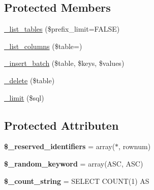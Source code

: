 \subsection*{Protected Members}
\begin{DoxyCompactItemize}
\item 
\mbox{\hyperlink{class_c_i___d_b__pdo__oci__driver_a435c0f3ce54fe7daa178baa8532ebd54}{\+\_\+list\+\_\+tables}} (\$prefix\+\_\+limit=F\+A\+L\+SE)
\item 
\mbox{\hyperlink{class_c_i___d_b__pdo__oci__driver_a7ccb7f9c301fe7f0a9db701254142b63}{\+\_\+list\+\_\+columns}} (\$table=\textquotesingle{}\textquotesingle{})
\item 
\mbox{\hyperlink{class_c_i___d_b__pdo__oci__driver_a1978e1358c812587a46e242630365099}{\+\_\+insert\+\_\+batch}} (\$table, \$keys, \$values)
\item 
\mbox{\hyperlink{class_c_i___d_b__pdo__oci__driver_a133ea8446ded52589bd22cc9163d0896}{\+\_\+delete}} (\$table)
\item 
\mbox{\hyperlink{class_c_i___d_b__pdo__oci__driver_a3a02ea06541b8ecc25a33a61651562c8}{\+\_\+limit}} (\$sql)
\end{DoxyCompactItemize}
\subsection*{Protected Attributen}
\begin{DoxyCompactItemize}
\item 
\mbox{\label{class_c_i___d_b__pdo__oci__driver_aa3298c4c62fbee8bb09f1b75b633fb0d}} 
{\bfseries \$\+\_\+reserved\+\_\+identifiers} = array(\textquotesingle{}$\ast$\textquotesingle{}, \textquotesingle{}rownum\textquotesingle{})
\item 
\mbox{\label{class_c_i___d_b__pdo__oci__driver_a10213aa6e05f6d924d3277bb1d2fea00}} 
{\bfseries \$\+\_\+random\+\_\+keyword} = array(\textquotesingle{}A\+SC\textquotesingle{}, \textquotesingle{}A\+SC\textquotesingle{})
\item 
\mbox{\label{class_c_i___d_b__pdo__oci__driver_a06c80bac2ecbd0557827e96949c23097}} 
{\bfseries \$\+\_\+count\+\_\+string} = \textquotesingle{}S\+E\+L\+E\+CT C\+O\+U\+NT(1) AS \textquotesingle{}
\end{DoxyCompactItemize}


